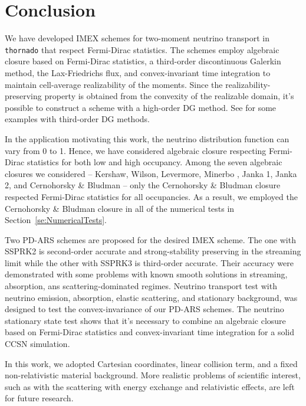 \section{Conclusion}\label{se:Conclusion}

We have developed IMEX schemes for two-moment neutrino transport in \texttt{thornado} that respect Fermi-Dirac statistics.
The schemes employ algebraic closure based on Fermi-Dirac statistics, a third-order discontinuous Galerkin method, the Lax-Friedrichs flux, and convex-invariant time integration to maintain cell-average realizability of the moments.
Since the realizability-preserving property is obtained from the convexity of the realizable domain, it's possible to construct a scheme with a high-order DG method.
See \cite{chu_etal_2018} for some examples with third-order DG methods.

In the application motivating this work, the neutrino distribution function can vary from 0 to 1.
Hence, we have considered algebraic closure respecting Fermi-Dirac statistics for both low and high occupancy.
Among the seven algebraic closures we considered -- Kershaw\cite{kershaw_1976}, Wilson\cite{wilson_1975,leblancWilson_1970}, Levermore\cite{levermore_1984}, Minerbo \cite{minerbo_1978}, Janka 1\cite{janka_1991}, Janka 2\cite{janka_1992}, and Cernohorsky \& Bludman\cite{cernohorskyBludman_1994} -- only the Cernohorsky \& Bludman closure respected Fermi-Dirac statistics for all occupancies.
As a result, we employed the Cernohorsky \& Bludman closure in all of the numerical tests in Section~\ref{se:NumericalTests}.

Two PD-ARS schemes are proposed for the desired IMEX scheme.
The one with SSPRK2 is second-order accurate and strong-stability preserving in the streaming limit while the other with SSPRK3 is third-order accurate.
Their accuracy were demonstrated with some problems with known smooth solutions in streaming, absorption, ans scattering-dominated regimes.
Neutrino transport test with neutrino emission, absorption, elastic scattering, and stationary background, was designed to test the convex-invariance of our PD-ARS schemes.
The neutrino stationary state test shows that it's necessary to combine an algebraic closure based on Fermi-Dirac statistics and convex-invariant time integration for a solid CCSN simulation.

In this work, we adopted Cartesian coordinates, linear collision term, and a fixed non-relativistic material background.
More realistic problems of scientific interest, such as with the scattering with energy exchange and relativistic effects, are left for future research.